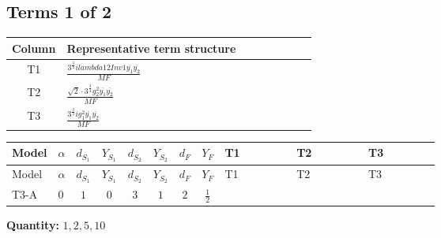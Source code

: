 \documentclass[8pt]{article}
\begin{document}
\begin{landscape}
\subsection*{Terms 1 of 2}
\begin{center}
\begin{tabular}{@{}c >{\raggedright\arraybackslash}p{0.82\linewidth}@{}}
\toprule
Column & Representative term structure \\
\midrule
T1 & \(\displaystyle \frac{3^{\frac{3}{4}} i lambda12Inv1 \overline{y_{1}} \overline{y_{2}}}{MF}\) \\
\midrule
T2 & \(\displaystyle \frac{\sqrt{2} \cdot 3^{\frac{3}{4}} g_{2}^{2} \overline{y_{1}} \overline{y_{2}}}{MF}\) \\
\midrule
T3 & \(\displaystyle \frac{3^{\frac{3}{4}} i g_{1}^{2} \overline{y_{1}} \overline{y_{2}}}{MF}\) \\
\midrule
\bottomrule
\end{tabular}
\end{center}
\smallskip
\tiny
\begin{longtable}{@{}llcccccc >{\raggedright\arraybackslash}p{0.21\linewidth} >{\raggedright\arraybackslash}p{0.21\linewidth} >{\raggedright\arraybackslash}p{0.21\linewidth}@{}}
\toprule
Model & $\alpha$ & $d_{S_1}$ & $Y_{S_1}$ & $d_{S_2}$ & $Y_{S_2}$ & $d_F$ & $Y_F$ & T1 & T2 & T3 \\
\midrule
\endfirsthead
\toprule
Model & $\alpha$ & $d_{S_1}$ & $Y_{S_1}$ & $d_{S_2}$ & $Y_{S_2}$ & $d_F$ & $Y_F$ & T1 & T2 & T3 \\
\midrule
\endhead
T3-A & $0$ & $1$ & $0$ & $3$ & $1$ & $2$ & $\frac{1}{2}$ & \scriptsize\adjustbox{max width=\linewidth}{$\begin{gathered} \frac{3^{\frac{3}{4}} i lambda12Inv1 \overline{y_{1}} \overline{y_{2}}}{6 MF}\end{gathered}$} & \scriptsize\adjustbox{max width=\linewidth}{$\begin{gathered} \frac{\sqrt{2} \cdot 3^{\frac{3}{4}} g_{2}^{2} \overline{y_{1}} \overline{y_{2}}}{6 MF}\end{gathered}$} & \scriptsize\adjustbox{max width=\linewidth}{$\begin{gathered} \frac{3^{\frac{3}{4}} i g_{1}^{2} \overline{y_{1}} \overline{y_{2}}}{8 MF}\end{gathered}$} \\
\midrule
\bottomrule
\end{longtable}
\clearpage
\noindent\textbf{Quantity: }$\mathrm{1,2,5,10}$\par\smallskip

\end{landscape}
\end{document}
